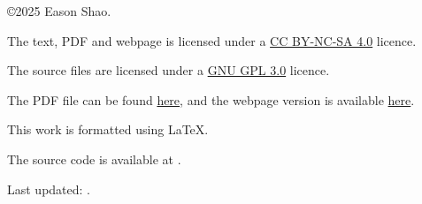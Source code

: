 \noindent \copyright 2025 Eason Shao.

\noindent The text, PDF and webpage is licensed under a \href{https://creativecommons.org/licenses/by-nc-sa/4.0/}{CC BY-NC-SA 4.0} licence.

\noindent The source files are licensed under a \href{https://www.gnu.org/licenses/gpl-3.0.en.html#license-text}{GNU GPL 3.0} licence.

\noindent The PDF file can be found \href{https://step.easonshao.com/latest.pdf}{here}, and the webpage version is available \href{https://step.easonshao.com/}{here}.

\noindent This work is formatted using \LaTeX.

\noindent The source code is available at .

\noindent Last updated: \Date.